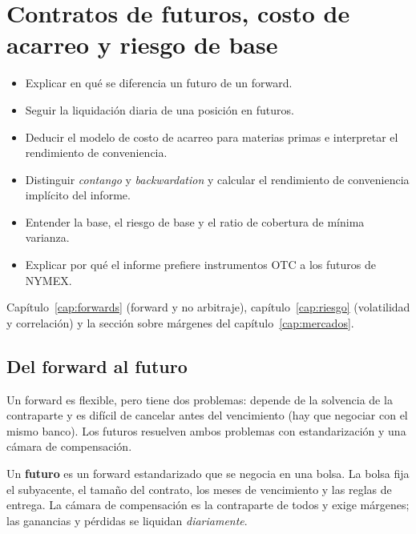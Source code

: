 \chapter{Contratos de futuros, costo de acarreo y riesgo de base}\label{cap:futuros}

\begin{objetivos}
\begin{itemize}
\item Explicar en qué se diferencia un futuro de un forward.
\item Seguir la liquidación diaria de una posición en futuros.
\item Deducir el modelo de costo de acarreo para materias primas e interpretar el rendimiento de conveniencia.
\item Distinguir \emph{contango} y \emph{backwardation} y calcular el rendimiento de conveniencia implícito del informe.
\item Entender la base, el riesgo de base y el ratio de cobertura de mínima varianza.
\item Explicar por qué el informe prefiere instrumentos OTC a los futuros de NYMEX.
\end{itemize}
\end{objetivos}

\begin{prerreq}Capítulo~\ref{cap:forwards} (forward y no arbitraje), capítulo~\ref{cap:riesgo} (volatilidad y correlación) y la sección sobre márgenes del capítulo~\ref{cap:mercados}.\end{prerreq}

\section{Del forward al futuro}

Un forward es flexible, pero tiene dos problemas: depende de la solvencia de la contraparte y es difícil de cancelar antes del vencimiento (hay que negociar con el mismo banco). Los futuros resuelven ambos problemas con estandarización y una cámara de compensación.

\begin{definicion}
Un \textbf{futuro} es un forward estandarizado que se negocia en una bolsa. La bolsa fija el subyacente, el tamaño del contrato, los meses de vencimiento y las reglas de entrega. La cámara de compensación es la contraparte de todos y exige márgenes; las ganancias y pérdidas se liquidan \emph{diariamente}.
\end{definicion}

